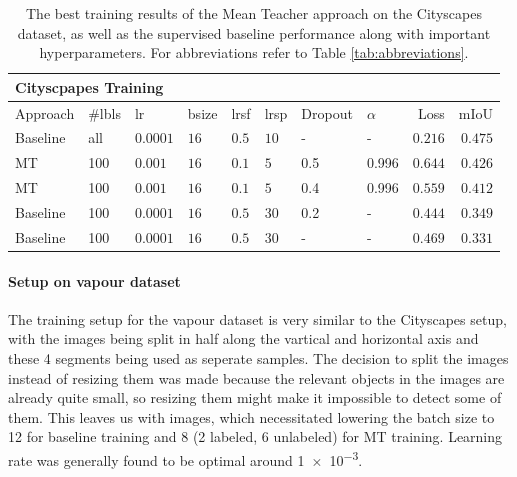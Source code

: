 \begin{table}[htbp]
    \centering
    \begin{tabular}{llllllllrr}
        \toprule
        \multicolumn{9}{l}{Cityscpapes Training}\\  
        \midrule
        Approach & \#lbls & lr & bsize & lrsf & lrsp & Dropout & $\alpha$ & Loss &
        mIoU \\
        \midrule 
        Baseline & all & $0.0001$ & $16$ & $0.5$ & $10$ & - & - & $0.216$ & $0.475$ \\
        MT & 100 & $0.001$ & $16$ & $0.1$ & $5$ & \num{0.5} & \num{0.996} & $0.644$ & $\mathbf{0.426}$ \\
        MT & 100 & $0.001$ & $16$ & $0.1$ & $5$ & \num{0.4} & \num{0.996} & $0.559$ & $0.412$ \\
        Baseline & 100 & $0.0001$ & $16$ & $0.5$ & $30$ & \num{0.2} & - & $0.444$ & $0.349$ \\
        Baseline & 100 & $0.0001$ & $16$ & $0.5$ & $30$ & - & - & $0.469$ & $0.331$ \\
        \bottomrule
    \end{tabular}
    \vspace{0.1cm}
    \caption{The best training results of the Mean Teacher approach on the Cityscapes dataset, as well as the supervised baseline performance along with important hyperparameters. For abbreviations refer to Table \ref{tab:abbreviations}.}
    \label{tab:cityscapes_results_mt}
\end{table}

\paragraph{Setup on vapour dataset}
The training setup for the vapour dataset is very similar to the Cityscapes setup, with the images being split in half along the vartical and horizontal axis and these 4 segments being used as seperate samples. The decision to split the images instead of resizing them was made because the relevant objects in the images are already quite small, so resizing them might make it impossible to detect some of them. This leaves us with  images, which necessitated lowering the batch size to 12 for baseline training and 8 (2 labeled, 6 unlabeled) for MT training.
Learning rate was generally found to be optimal around \num{1e-3}.


